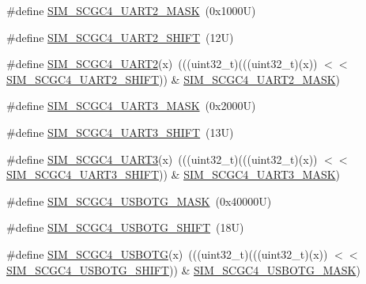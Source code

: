 \begin{DoxyCompactItemize}
\item 
\#define \mbox{\hyperlink{group___s_i_m___register___masks_gaea7b7b8d6abc055026d4ca7299206597}{S\+I\+M\+\_\+\+S\+C\+G\+C4\+\_\+\+U\+A\+R\+T2\+\_\+\+M\+A\+SK}}~(0x1000\+U)
\item 
\#define \mbox{\hyperlink{group___s_i_m___register___masks_gae844b2ce3371466add7387b9ea32bc4c}{S\+I\+M\+\_\+\+S\+C\+G\+C4\+\_\+\+U\+A\+R\+T2\+\_\+\+S\+H\+I\+FT}}~(12\+U)
\item 
\#define \mbox{\hyperlink{group___s_i_m___register___masks_ga86824f3937c50886253e76d3983a6799}{S\+I\+M\+\_\+\+S\+C\+G\+C4\+\_\+\+U\+A\+R\+T2}}(x)~(((uint32\+\_\+t)(((uint32\+\_\+t)(x)) $<$$<$ \mbox{\hyperlink{group___s_i_m___register___masks_gae844b2ce3371466add7387b9ea32bc4c}{S\+I\+M\+\_\+\+S\+C\+G\+C4\+\_\+\+U\+A\+R\+T2\+\_\+\+S\+H\+I\+FT}})) \& \mbox{\hyperlink{group___s_i_m___register___masks_gaea7b7b8d6abc055026d4ca7299206597}{S\+I\+M\+\_\+\+S\+C\+G\+C4\+\_\+\+U\+A\+R\+T2\+\_\+\+M\+A\+SK}})
\item 
\#define \mbox{\hyperlink{group___s_i_m___register___masks_gaaf5646fd261bf76417a69902f7405a98}{S\+I\+M\+\_\+\+S\+C\+G\+C4\+\_\+\+U\+A\+R\+T3\+\_\+\+M\+A\+SK}}~(0x2000\+U)
\item 
\#define \mbox{\hyperlink{group___s_i_m___register___masks_ga065aa606af68b4a53adc773e6661b67d}{S\+I\+M\+\_\+\+S\+C\+G\+C4\+\_\+\+U\+A\+R\+T3\+\_\+\+S\+H\+I\+FT}}~(13\+U)
\item 
\#define \mbox{\hyperlink{group___s_i_m___register___masks_gaa3c198d58b1dfd48344a04c0c241b706}{S\+I\+M\+\_\+\+S\+C\+G\+C4\+\_\+\+U\+A\+R\+T3}}(x)~(((uint32\+\_\+t)(((uint32\+\_\+t)(x)) $<$$<$ \mbox{\hyperlink{group___s_i_m___register___masks_ga065aa606af68b4a53adc773e6661b67d}{S\+I\+M\+\_\+\+S\+C\+G\+C4\+\_\+\+U\+A\+R\+T3\+\_\+\+S\+H\+I\+FT}})) \& \mbox{\hyperlink{group___s_i_m___register___masks_gaaf5646fd261bf76417a69902f7405a98}{S\+I\+M\+\_\+\+S\+C\+G\+C4\+\_\+\+U\+A\+R\+T3\+\_\+\+M\+A\+SK}})
\item 
\#define \mbox{\hyperlink{group___s_i_m___register___masks_ga136bfa98e3aafded899c9806d5410d4d}{S\+I\+M\+\_\+\+S\+C\+G\+C4\+\_\+\+U\+S\+B\+O\+T\+G\+\_\+\+M\+A\+SK}}~(0x40000\+U)
\item 
\#define \mbox{\hyperlink{group___s_i_m___register___masks_ga5d0dd9f68667fdf71fce1b0a6ae990dd}{S\+I\+M\+\_\+\+S\+C\+G\+C4\+\_\+\+U\+S\+B\+O\+T\+G\+\_\+\+S\+H\+I\+FT}}~(18\+U)
\item 
\#define \mbox{\hyperlink{group___s_i_m___register___masks_ga4c2220314f3b7b0d6451bd9f94df5316}{S\+I\+M\+\_\+\+S\+C\+G\+C4\+\_\+\+U\+S\+B\+O\+TG}}(x)~(((uint32\+\_\+t)(((uint32\+\_\+t)(x)) $<$$<$ \mbox{\hyperlink{group___s_i_m___register___masks_ga5d0dd9f68667fdf71fce1b0a6ae990dd}{S\+I\+M\+\_\+\+S\+C\+G\+C4\+\_\+\+U\+S\+B\+O\+T\+G\+\_\+\+S\+H\+I\+FT}})) \& \mbox{\hyperlink{group___s_i_m___register___masks_ga136bfa98e3aafded899c9806d5410d4d}{S\+I\+M\+\_\+\+S\+C\+G\+C4\+\_\+\+U\+S\+B\+O\+T\+G\+\_\+\+M\+A\+SK}})
$$
\end{DoxyCompactItemize}
